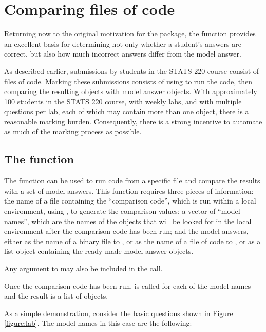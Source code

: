 \section*{Comparing files of \R{} code}

Returning now to the original motivation for the  package,
the  function provides an excellent basis for determining
not only whether a student's answers are correct, but also how much
incorrect answers differ from the model answer.

As described earlier, submissions by students in the STATS 220 course consist
of files of \R{} code.  Marking these submissions consists of using 
 to run the code, then comparing the resulting objects
with model answer objects.
With approximately 100 students
in the STATS 220 course, with weekly labs, and with multiple questions per lab,
each of which may contain more than one \R{} object, there is 
a reasonable marking burden.
Consequently, there is a strong incentive to automate
as much
of the marking process as possible.  

\subsection*{The  function}

The  function can be used to run \R{} code from a 
specific file and compare the results with a set of model answers.
This function
requires three pieces of 
information:  the name of a file containing the ``comparison code'', 
which is run
within a local environment,
using , to generate the comparison values; 
a vector of ``model names'', which are the names of the objects that will 
be looked for in the local environment after the comparison code has been run;
and the model answers, either as the name of a binary file to 
, or as the name of a file of \R{} code to 
, or as a list object containing the ready-made
model answer objects.

Any argument to  may also be included in the call.

Once the comparison code has been run, 
 is called for each of the model names and the result
is a list of 
 objects.

As a simple demonstration, consider
the basic questions shown in Figure \ref{figure:lab}.
The model names in this case are the following:

